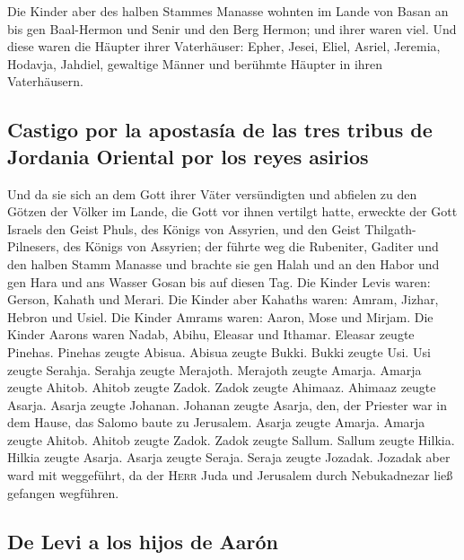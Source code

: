 Die Kinder aber des halben Stammes Manasse wohnten im
Lande von Basan an bis gen Baal-Hermon und Senir und den Berg Hermon;
und ihrer waren viel.  Und diese waren die Häupter ihrer
Vaterhäuser: Epher, Jesei, Eliel, Asriel, Jeremia, Hodavja, Jahdiel,
gewaltige Männer und berühmte Häupter in ihren Vaterhäusern.

\hypertarget{castigo-por-la-apostasuxeda-de-las-tres-tribus-de-jordania-oriental-por-los-reyes-asirios}{%
\subsection{Castigo por la apostasía de las tres tribus de Jordania
Oriental por los reyes
asirios}\label{castigo-por-la-apostasuxeda-de-las-tres-tribus-de-jordania-oriental-por-los-reyes-asirios}}

 Und da sie sich an dem Gott ihrer Väter versündigten und
abfielen zu den Götzen der Völker im Lande, die Gott vor ihnen vertilgt
hatte,  erweckte der Gott Israels den Geist Phuls, des
Königs von Assyrien, und den Geist Thilgath-Pilnesers, des Königs von
Assyrien; der führte weg die Rubeniter, Gaditer und den halben Stamm
Manasse und brachte sie gen Halah und an den Habor und gen Hara und ans
Wasser Gosan bis auf diesen Tag.  Die Kinder Levis waren:
Gerson, Kahath und Merari.  Die Kinder aber Kahaths
waren: Amram, Jizhar, Hebron und Usiel.  Die Kinder
Amrams waren: Aaron, Mose und Mirjam. Die Kinder Aarons waren Nadab,
Abihu, Eleasar und Ithamar.  Eleasar zeugte Pinehas.
Pinehas zeugte Abisua.  Abisua zeugte Bukki. Bukki zeugte
Usi.  Usi zeugte Serahja. Serahja zeugte Merajoth.
 Merajoth zeugte Amarja. Amarja zeugte Ahitob.
 Ahitob zeugte Zadok. Zadok zeugte Ahimaaz.
 Ahimaaz zeugte Asarja. Asarja zeugte Johanan.
 Johanan zeugte Asarja, den, der Priester war in dem
Hause, das Salomo baute zu Jerusalem.  Asarja zeugte
Amarja. Amarja zeugte Ahitob.  Ahitob zeugte Zadok. Zadok
zeugte Sallum.  Sallum zeugte Hilkia. Hilkia zeugte
Asarja.  Asarja zeugte Seraja. Seraja zeugte Jozadak.
 Jozadak aber ward mit weggeführt, da der \textsc{Herr}
Juda und Jerusalem durch Nebukadnezar ließ gefangen wegführen.

\hypertarget{de-levi-a-los-hijos-de-aaruxf3n}{%
\subsection{De Levi a los hijos de
Aarón}\label{de-levi-a-los-hijos-de-aaruxf3n}}

